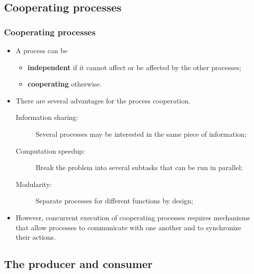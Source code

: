 \documentclass[CJKutf8,xcolor=pdftex,dvipsnames,table]{beamer}
\begin{document}
\begin{CJK*}{UTF8}{song}
  \section{Cooperating processes}

  \begin{frame}
  \frametitle{Cooperating processes} \pause
  \begin{itemize}
  \item{A process can be} \pause
    \begin{itemize}
    \item{\textbf{independent} if it cannot affect or be affected by the other processes;} \pause
    \item{\textbf{cooperating} otherwise.} \pause
    \end{itemize}
  \item{There are several advantages for the process cooperation.} \pause
    \begin{description}
    \item[Information sharing:]{Several processes may be interested in the same piece of information;} \pause
    \item[Computation speedup:]{Break the problem into several subtasks that can be run in parallel;} \pause
    \item[Modularity:]{Separate processes for different functions by design;} \pause
    \end{description}
  \item{However, concurrent execution of cooperating processes requires mechanisms that allow processes to communicate with one another and to synchronize their actions.}
  \end{itemize}
  \end{frame}

  \subsection{The producer and consumer}


\end{CJK*}
\end{document}
